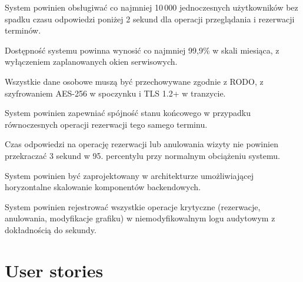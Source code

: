 \documentclass[12pt,a4paper]{article}
\begin{document}
\begin{description}[leftmargin=1.8cm, labelwidth=1.3cm, labelsep=0.5cm, style=nextline]
  \item[NFR1] System powinien obsługiwać co najmniej 10\,000 jednoczesnych użytkowników bez spadku czasu odpowiedzi poniżej 2 sekund dla operacji przeglądania i rezerwacji terminów.
  \item[NFR2] Dostępność systemu powinna wynosić co najmniej 99,9\% w skali miesiąca, z wyłączeniem zaplanowanych okien serwisowych.
  \item[NFR3] Wszystkie dane osobowe muszą być przechowywane zgodnie z RODO, z szyfrowaniem AES-256 w spoczynku i TLS 1.2+ w tranzycie.
  \item[NFR4] System powinien zapewniać spójność stanu końcowego w przypadku równoczesnych operacji rezerwacji tego samego terminu.
  \item[NFR5] Czas odpowiedzi na operację rezerwacji lub anulowania wizyty nie powinien przekraczać 3 sekund w 95. percentylu przy normalnym obciążeniu systemu.
  \item[NFR6] System powinien być zaprojektowany w architekturze umożliwiającej horyzontalne skalowanie komponentów backendowych.
  \item[NFR7] System powinien rejestrować wszystkie operacje krytyczne (rezerwacje, anulowania, modyfikacje grafiku) w niemodyfikowalnym logu audytowym z dokładnością do sekundy.
\end{description}

\section{User stories}
\end{document}
